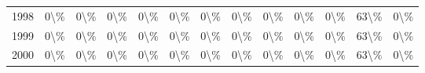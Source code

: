 \begin{table}
\begin{tabular}[t]{rllllllllllll}
1998 & 0\textbackslash{}\% & 0\textbackslash{}\% & 0\textbackslash{}\% & 0\textbackslash{}\% & 0\textbackslash{}\% & 0\textbackslash{}\% & 0\textbackslash{}\% & 0\textbackslash{}\% & 0\textbackslash{}\% & 0\textbackslash{}\% & 63\textbackslash{}\% & 0\textbackslash{}\%\\
1999 & 0\textbackslash{}\% & 0\textbackslash{}\% & 0\textbackslash{}\% & 0\textbackslash{}\% & 0\textbackslash{}\% & 0\textbackslash{}\% & 0\textbackslash{}\% & 0\textbackslash{}\% & 0\textbackslash{}\% & 0\textbackslash{}\% & 63\textbackslash{}\% & 0\textbackslash{}\%\\
2000 & 0\textbackslash{}\% & 0\textbackslash{}\% & 0\textbackslash{}\% & 0\textbackslash{}\% & 0\textbackslash{}\% & 0\textbackslash{}\% & 0\textbackslash{}\% & 0\textbackslash{}\% & 0\textbackslash{}\% & 0\textbackslash{}\% & 63\textbackslash{}\% & 0\textbackslash{}\%\\
\bottomrule
\end{tabular}
\end{table}
